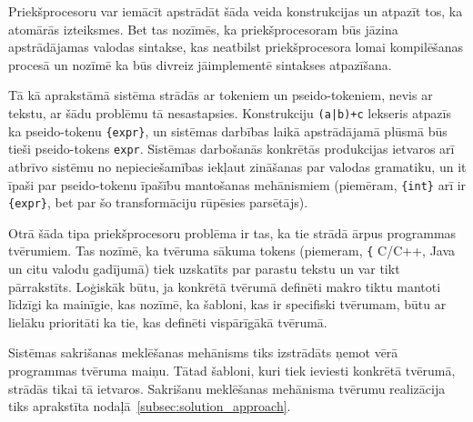 Priekšprocesoru var iemācīt apstrādāt šāda veida konstrukcijas un atpazīt tos, ka atomārās izteiksmes. Bet tas nozīmēs, ka priekšprocesoram būs jāzina apstrādājamas valodas sintakse, kas neatbilst priekšprocesora lomai kompilēšanas procesā un nozīmē ka būs divreiz jāimplementē sintakses atpazīšana.

Tā kā aprakstāmā sistēma strādās ar tokeniem un pseido-tokeniem, nevis ar tekstu, ar šādu problēmu tā nesastapsies. Konstrukciju \verb/(a|b)+c/ lekseris atpazīs ka pseido-tokenu \verb|{expr}|, un sistēmas darbības laikā apstrādājamā plūsmā būs tieši pseido-tokens \verb|expr|. Sistēmas darbošanās konkrētās produkcijas ietvaros arī atbrīvo sistēmu no nepieciešamības iekļaut zināšanas par valodas gramatiku, un it īpaši par pseido-tokenu īpašību mantošanas mehānismiem (piemēram, \verb|{int}| arī ir \verb|{expr}|, bet par šo transformāciju rūpēsies parsētājs).

Otrā šāda tipa priekšprocesoru problēma ir tas, ka tie strādā ārpus programmas tvērumiem. Tas nozīmē, ka tvēruma sākuma tokens (piemeram, \verb|{| C/C++, Java un citu valodu gadījumā) tiek uzskatīts par parastu tekstu un var tikt pārrakstīts. Loģiskāk būtu, ja konkrētā tvērumā definēti makro tiktu mantoti līdzīgi ka mainīgie, kas nozīmē, ka šabloni, kas ir specifiski tvērumam, būtu ar lielāku prioritāti ka tie, kas definēti vispārīgākā tvērumā. 

Sistēmas sakrišanas meklēšanas mehānisms tiks izstrādāts ņemot vērā programmas tvēruma maiņu. Tātad šabloni, kuri tiek ieviesti konkrētā tvērumā, strādās tikai tā ietvaros. Sakrišanu meklēšanas mehānisma tvērumu realizācija tiks aprakstīta nodaļā~\ref{subsec:solution_approach}.

